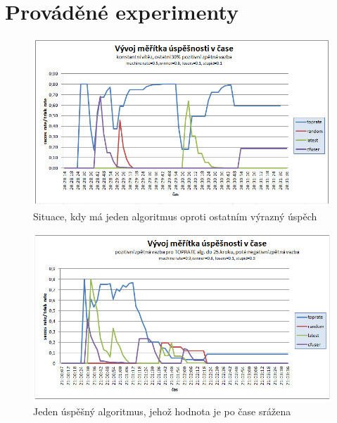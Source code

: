 \documentclass[thesis=M,czech]{FITthesis}[2014/05/07]
\begin{document}
\chapter{Prováděné experimenty}
\label{experiments}

\begin{figure}\centering
	\includegraphics[width=1.0\textwidth]{obr/experimenty/test1.png}
 	\caption[Situace, kdy má jeden algoritmus oproti ostatním výrazný úspěch]{Situace, kdy má jeden algoritmus oproti ostatním výrazný úspěch}\label{fig:test1}
\end{figure}	

\begin{figure}\centering
	\includegraphics[width=1.0\textwidth]{obr/experimenty/test5.png}
 	\caption[Jeden úspěšný algoritmus, jehož hodnota je po čase srážena]{Jeden úspěšný algoritmus, jehož hodnota je po čase srážena}\label{fig:test5}
\end{figure}	
\end{document}
